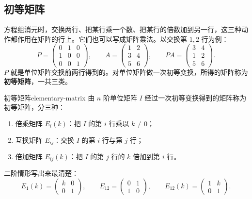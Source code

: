 \subsection{初等矩阵}

方程组消元时，交换两行、把某行乘一个数、把某行的倍数加到另一行，这三种动作都作用在矩阵的行上。它们也可以写成矩阵乘法。以交换第 \(1,2\) 行为例：
\[
P=\begin{pmatrix}0&1&0\\1&0&0\\0&0&1\end{pmatrix},\qquad
A=\begin{pmatrix}1&2\\3&4\\5&6\end{pmatrix},\qquad
PA=\begin{pmatrix}3&4\\1&2\\5&6\end{pmatrix}.
\]
\(P\) 就是单位矩阵交换前两行得到的。对单位矩阵做一次初等变换，所得的矩阵称为\textbf{初等矩阵}，一共三类。

\begin{mydef}{初等矩阵}{elementary-matrix}
由 \(n\) 阶单位矩阵 \(I\) 经过一次初等变换得到的矩阵称为初等矩阵，分三种：
\begin{enumerate}
    \item 倍乘矩阵 \(E_i(k)\)：把 \(I\) 的第 \(i\) 行乘以 \(k\neq0\)；
    \item 互换矩阵 \(E_{ij}\)：交换 \(I\) 的第 \(i\) 行与第 \(j\) 行；
    \item 倍加矩阵 \(E_{ij}(k)\)：把 \(I\) 的第 \(j\) 行的 \(k\) 倍加到第 \(i\) 行。
\end{enumerate}
\end{mydef}

二阶情形写出来最清楚：
\[
E_1(k)=\begin{pmatrix}k&0\\0&1\end{pmatrix},\qquad
E_{12}=\begin{pmatrix}0&1\\1&0\end{pmatrix},\qquad
E_{12}(k)=\begin{pmatrix}1&k\\0&1\end{pmatrix}.
\]

